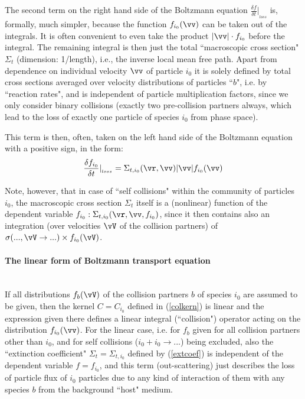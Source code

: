 The second term on the right hand side of the Boltzmann equation $\frac{\delta f}{\delta t}|_{_{loss}}$ is, formally, much simpler, because
the function $f_{i_0}(\vv)$ can be taken out of the integrals.
It is often convenient to even take the product $|\vv| \cdot f_{i_0}$ before the
integral. The remaining integral is then just the total
``macroscopic cross section" $\Sigma_t$ (dimension: 1/length), i.e., the inverse local mean
free path. Apart from dependence on individual velocity $\vv$  of particle $i_0$ it is solely defined by total
cross sections averaged over velocity distributions of particles ``$b$", i.e. by ``reaction rates", and is independent of particle multiplication factors, since we
only consider binary collisions (exactly two pre-collision partners always, which lead to the loss of exactly
one particle of species $i_0$ from phase space).

This term is then, often, taken on the left hand side of the
Boltzmann equation with a positive sign, in the form:
\begin{equation}\label{extcoef}
\frac{\delta f_{i_0}}{\delta t}|_{_{loss}}
 =
\Sigma_{t,i_0}(\vr,\vv) |\vv|
f_{i_0}(\vv)
\end{equation}

Note, however, that in case of ``self collisions" within the community of particles $i_0$, the macroscopic cross section $\Sigma_t$
itself is a (nonlinear) function of the dependent
variable $f_{i_0}: \Sigma_{t,i_0}(\vr,\vv,f_{i_0})$,
since it then contains also an integration (over velocities $\vV$ of the collision partners) of $\sigma(...,\vV \rightarrow ...) \times f_{i_0}(\vV)$.

\paragraph{The linear form of Boltzmann transport equation}\mbox{}\\

If all distributions $f_b(\vV)$ of  the collision partners $b$ of species $i_0$ are assumed to be given, then the
kernel $C = C_{i_0}$ defined in (\ref{colkern}) is linear and the expression given there defines  a linear
integral (``collision") operator acting on the distribution $f_{i_0}(\vv)$.
For the linear case, i.e. for $f_b$ given for all collision partners other than $i_0$, and for self collisions ($i_0 + i_0 \rightarrow ...$) being excluded, also the ``extinction coefficient"
$\Sigma_t = \Sigma_{t,i_0}$ defined by (\ref{extcoef}) is independent of the dependent variable $f = f_{i_0}$,
and this term (out-scattering) just describes the loss of particle
flux of $i_0$ particles due to any kind of interaction of them with any species $b$ from
the background ``host" medium.

